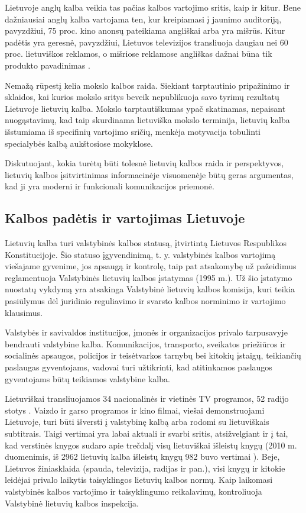 \documentclass[]{../metanetpaper}
\begin{document}
\begin{multicols}{2}
    Lietuvoje anglų kalba veikia tas pačias kalbos vartojimo sritis, kaip ir kitur. Bene dažniausiai anglų kalba vartojama ten, kur kreipiamasi į jaunimo auditoriją, pavyzdžiui, 75 proc. kino anonsų pateikiama angliškai arba yra mišrūs. Kitur padėtis yra geresnė, pavyzdžiui, Lietuvos televizijos transliuoja daugiau nei 60 proc. lietuviškos reklamos, o mišriose reklamose angliškas dažnai būna tik produkto pavadinimas \cite{nbi2}.

Nemažą rūpestį kelia mokslo kalbos raida. Siekiant tarptautinio pripažinimo ir sklaidos, kai kurios mokslo sritys beveik nepublikuoja savo tyrimų rezultatų Lietuvoje lietuvių kalba. Mokslo tarptautiškumas ypač skatinamas, nepaisant nuogąstavimų, kad taip skurdinama lietuviška mokslo terminija, lietuvių kalba išstumiama iš specifinių vartojimo sričių, menkėja motyvacija tobulinti specialybės kalbą aukštosiose mokyklose.

Diskutuojant, kokia turėtų būti tolesnė lietuvių kalbos raida ir perspektyvos, lietuvių kalbos įsitvirtinimas informacinėje visuomenėje būtų geras argumentas, kad ji yra moderni ir funkcionali komunikacijos priemonė.

\subsection{Kalbos padėtis ir vartojimas Lietuvoje}

Lietuvių kalba turi valstybinės kalbos statusą, įtvirtintą Lietuvos Respublikos Konstitucijoje. Šio statuso įgyvendinimą, t. y. valstybinės kalbos vartojimą viešajame gyvenime, jos apsaugą ir kontrolę, taip pat atsakomybę už pažeidimus reglamentuoja Valstybinės lietuvių kalbos įstatymas (1995 m.). Už šio įstatymo nuostatų vykdymą yra atsakinga Valstybinė lietuvių kalbos komisija, kuri teikia pasiūlymus dėl juridinio reguliavimo ir svarsto kalbos norminimo ir vartojimo klausimus.  


 Valstybės ir savivaldos institucijos, įmonės ir organizacijos privalo tarpusavyje bendrauti valstybine kalba. Komunikacijos, transporto, sveikatos priežiūros ir socialinės apsaugos, policijos ir teisėtvarkos tarnybų bei kitokių įstaigų, teikiančių paslaugas gyventojams, vadovai turi užtikrinti, kad atitinkamos paslaugos gyventojams būtų teikiamos valstybine kalba.   

    Lietuviškai transliuojamos 34 nacionalinės ir vietinės TV programos, 52 radijo stotys \cite{ldrt}.  Vaizdo ir garso programos ir kino filmai, viešai demonstruojami Lietuvoje, turi būti išversti į valstybinę kalbą arba rodomi su lietuviškais subtitrais. Taigi vertimai yra labai aktuali ir svarbi sritis, atsižvelgiant ir į tai, kad verstinės knygos sudaro apie trečdalį visų lietuviškai išleistų knygų (2010 m. duomenimis, iš 2962 lietuvių kalba išleistų knygų 982 buvo vertimai \cite{bbsc}).  Beje, Lietuvos žiniasklaida (spauda, televizija, radijas ir pan.), visi knygų ir kitokie leidėjai privalo laikytis taisyklingos lietuvių kalbos normų. Kaip laikomasi valstybinės kalbos vartojimo ir taisyklingumo reikalavimų, kontroliuoja Valstybinė lietuvių kalbos inspekcija.   


\end{multicols}
\end{document}
